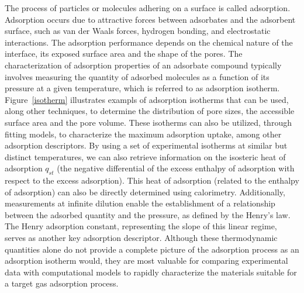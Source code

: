 \documentclass[main.tex]{subfiles}
\begin{document}
The process of particles or molecules adhering on a surface is called adsorption. Adsorption occurs due to attractive forces between adsorbates and the adsorbent surface, such as van der Waals forces, hydrogen bonding, and electrostatic interactions. The adsorption performance depends on the chemical nature of the interface, its exposed surface area and the shape of the pores. The characterization of adsorption properties of an adsorbate compound typically involves measuring the quantity of adsorbed molecules as a function of its pressure at a given temperature, which is referred to as adsorption isotherm. Figure~\ref{isotherm} illustrates exampls of adsorption isotherms that can be used, along other techniques, to determine the distribution of pore sizes, the accessible surface area and the pore volume.\autocite{Rouquerol_1994} These isotherms can also be utilized, through fitting models, to characterize the maximum adsorption uptake, among other adsorption descriptors.\autocite{Wang_2020} By using a set of experimental isotherms at similar but distinct temperatures, we can also retrieve information on the isosteric heat of adsorption $q_{st}$ (the negative differential of the excess enthalpy of adsorption with respect to the excess adsorption).\autocite{Nicholson2000} This heat of adsorption (related to the enthalpy of adsorption) can also be directly determined using calorimetry.\autocite{Dunne_1996} Additionally, measurements at infinite dilution enable the establishment of a relationship between the adsorbed quantity and the pressure, as defined by the Henry's law. The Henry adsorption constant, representing the slope of this linear regime,\autocite{Finsy2007} serves as another key adsorption descriptor. Although these thermodynamic quantities alone do not provide a complete picture of the adsorption process as an adsorption isotherm would, they are most valuable for comparing experimental data with computational models to rapidly characterize the materials suitable for a target gas adsorption process.
\end{document}
